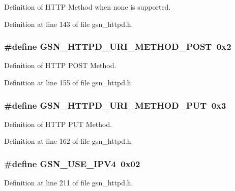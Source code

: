 Definition of HTTP Method when none is supported. 



Definition at line 143 of file gsn\_\-httpd.h.

\hypertarget{a00666_gafcfe6d0dabbefac822f05864c5b15aa6}{
\subsubsection[{GSN\_\-HTTPD\_\-URI\_\-METHOD\_\-POST}]{\setlength{\rightskip}{0pt plus 5cm}\#define GSN\_\-HTTPD\_\-URI\_\-METHOD\_\-POST~0x2}}
\label{a00666_gafcfe6d0dabbefac822f05864c5b15aa6}


Definition of HTTP POST Method. 



Definition at line 155 of file gsn\_\-httpd.h.

\hypertarget{a00666_ga770c378292f790cfba51990b41cf58dc}{
\subsubsection[{GSN\_\-HTTPD\_\-URI\_\-METHOD\_\-PUT}]{\setlength{\rightskip}{0pt plus 5cm}\#define GSN\_\-HTTPD\_\-URI\_\-METHOD\_\-PUT~0x3}}
\label{a00666_ga770c378292f790cfba51990b41cf58dc}


Definition of HTTP PUT Method. 



Definition at line 162 of file gsn\_\-httpd.h.

\hypertarget{a00666_ga1de955d22e5f48865ad9e80c3bdcf945}{
\subsubsection[{GSN\_\-USE\_\-IPV4}]{\setlength{\rightskip}{0pt plus 5cm}\#define GSN\_\-USE\_\-IPV4~0x02}}
\label{a00666_ga1de955d22e5f48865ad9e80c3bdcf945}


Definition at line 211 of file gsn\_\-httpd.h.

